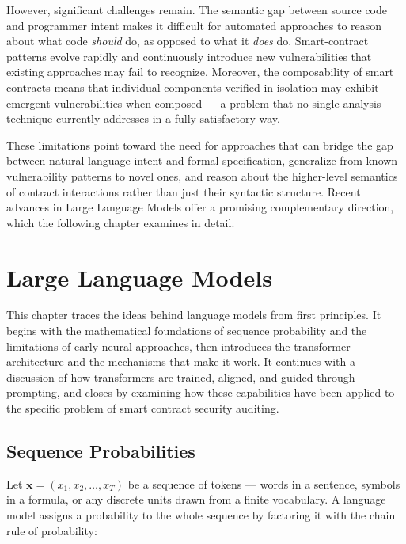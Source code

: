 However, significant challenges remain. The semantic gap between source code and programmer intent makes it difficult for automated approaches to reason about what code \emph{should} do, as opposed to what it \emph{does} do. Smart-contract patterns evolve rapidly and continuously introduce new vulnerabilities that existing approaches may fail to recognize. Moreover, the composability of smart contracts means that individual components verified in isolation may exhibit emergent vulnerabilities when composed --- a problem that no single analysis technique currently addresses in a fully satisfactory way.

These limitations point toward the need for approaches that can bridge the gap between natural-language intent and formal specification, generalize from known vulnerability patterns to novel ones, and reason about the higher-level semantics of contract interactions rather than just their syntactic structure. Recent advances in Large Language Models offer a promising complementary direction, which the following chapter examines in detail.


\chapter{Large Language Models}
\label{ch:llm}

This chapter traces the ideas behind language models from first principles. It begins with the mathematical foundations of sequence probability and the limitations of early neural approaches, then introduces the transformer architecture and the mechanisms that make it work. It continues with a discussion of how transformers are trained, aligned, and guided through prompting, and closes by examining how these capabilities have been applied to the specific problem of smart contract security auditing.

\section{Sequence Probabilities}
\label{sec:seq-prob}

Let $\mathbf{x} = (x_1, x_2, \dots, x_T)$ be a sequence of tokens --- words in a sentence, symbols in a formula, or any discrete units drawn from a finite vocabulary. A language model assigns a probability to the whole sequence by factoring it with the chain rule of probability:


